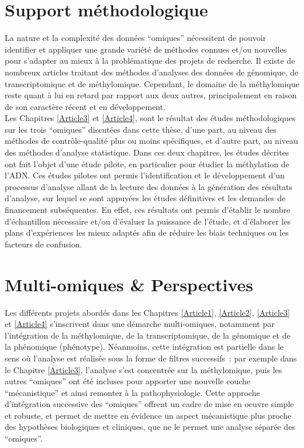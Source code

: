 \documentclass[11pt,a4paper,notrimn]{krantz}
\theoremstyle{definition}
\theoremstyle{definition}
\theoremstyle{remark}
\begin{document}
\section{Support méthodologique}\label{support-methodologique}

La nature et la complexité des données ``omiques'' nécessitent de
pouvoir identifier et appliquer une grande variété de méthodes connues
et/ou nouvelles pour s'adapter au mieux à la problématique des projets
de recherche. Il existe de nombreux articles traitant des méthodes
d'analyses des données de génomique, de transcriptomique et de
méthylomique. Cependant, le domaine de la méthylomique reste quant à lui
en retard par rapport aux deux autres, principalement en raison de son
caractère récent et en développement.\\
Les Chapitres \ref{Article3} et \ref{Article4}, sont le résultat des
études méthodologiques sur les trois ``omiques'' discutées dans cette
thèse, d'une part, au niveau des méthodes de contrôle-qualité plus ou
moins spécifiques, et d'autre part, au niveau des méthodes d'analyse
statistique. Dans ces deux chapitres, les études décrites ont fait
l'objet d'une étude pilote, en particulier pour étudier la méthylation
de l'ADN. Ces études pilotes ont permis l'identification et le
développement d'un processus d'analyse allant de la lecture des données
à la génération des résultats d'analyse, sur lequel se sont appuyées les
études définitives et les demandes de financement subséquentes. En
effet, ces résultats ont permis d'établir le nombre d'échantillon
nécessaire et/ou d'évaluer la puissance de l'étude, et d'élaborer les
plans d'expériences les mieux adaptés afin de réduire les biais
techniques ou les facteurs de confusion.

\section{Multi-omiques \&
Perspectives}\label{multi-omiques-perspectives}

Les différents projets abordés dans les Chapitres \ref{Article1},
\ref{Article2}, \ref{Article3} et \ref{Article4} s'inscrivent dans une
démarche multi-omiques, notamment par l'intégration de la méthylomique,
de la transcriptomique, de la génomique et de la phénomique (phénotype).
Néanmoins, cette intégration est partielle dans le sens où l'analyse est
réalisée sous la forme de filtres successifs~: par exemple dans le
Chapitre \ref{Article3}, l'analyse s'est concentrée sur la méthylomique,
puis les autres ``omiques'' ont été incluses pour apporter une nouvelle
couche ``mécanistique'' et ainsi remonter à la pathophysiologie. Cette
approche d'intégration successive des ``omiques'' offrent un cadre de
mise en oeuvre simple et robuste, et permet de mettre en évidence un
aspect mécanistique plus proche des hypothèses biologiques et cliniques,
que ne le permet une analyse séparée des ``omiques''.
\end{document}
